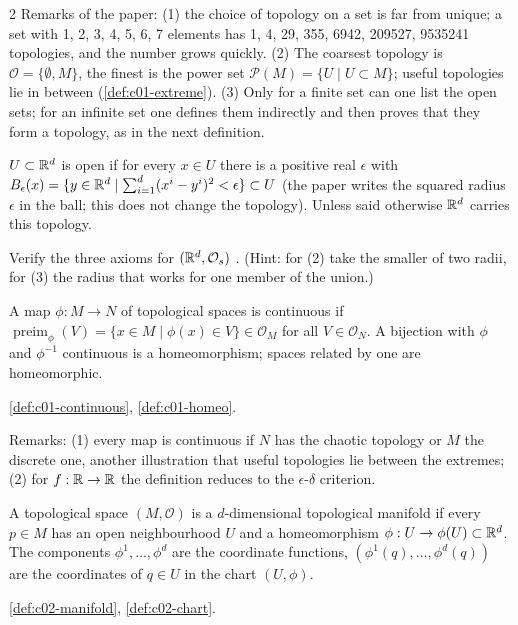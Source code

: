 \begin{paracol}{2}
Remarks of the paper: (1) the choice of topology on a set is far from unique; a set with 1, 2, 3, 4, 5, 6, 7 elements has 1, 4, 29, 355, 6942, 209527, 9535241 topologies, and the number grows quickly. (2) The coarsest topology is $\mathcal O=\{\emptyset,M\}$, the finest is the power set $\mathcal P(M)=\{U\mid U\subset M\}$; useful topologies lie in between (\cref{def:c01-extreme}). (3) Only for a finite set can one list the open sets; for an infinite set one defines them indirectly and then proves that they form a topology, as in the next definition.

\begin{definition}\label{def:c29-std}
$U\subset\mathbb{R}^d$ is open if for every $x\in U$ there is a positive real $\epsilon$ with $B_\epsilon(x)=\{y\in\mathbb{R}^d\mid\sum_{i=1}^d(x^i-y^i)^2<\epsilon\}\subset U$ (the paper writes the squared radius $\epsilon$ in the ball; this does not change the topology). Unless said otherwise $\mathbb{R}^d$ carries this topology.
\end{definition}

\begin{exercise}\label{ex:c29-rd}
Verify the three axioms for $(\mathbb{R}^d,\mathcal O_s)$ . (Hint: for (2) take the smaller of two radii, for (3) the radius that works for one member of the union.)
\end{exercise}

\begin{definition}\label{def:c29-cont}
A map $\phi:M\to N$ of topological spaces is continuous if $\operatorname{preim}_\phi(V)=\{x\in M\mid\phi(x)\in V\}\in\mathcal O_M$ for all $V\in\mathcal O_N$. A bijection with $\phi$ and $\phi^{-1}$ continuous is a homeomorphism; spaces related by one are homeomorphic.
\end{definition}
\begin{recall}[Continuity]
\cref{def:c01-continuous}, \cref{def:c01-homeo}.
\end{recall}

Remarks: (1) every map is continuous if $N$ has the chaotic topology or $M$ the discrete one, another illustration that useful topologies lie between the extremes; (2) for $f:\mathbb{R}\to\mathbb{R}$ the definition reduces to the $\epsilon$-$\delta$ criterion.

\begin{definition}\label{def:c29-manifold}
A topological space $(M,\mathcal O)$ is a $d$-dimensional topological manifold if every $p\in M$ has an open neighbourhood $U$ and a homeomorphism $\phi:U\to\phi(U)\subset\mathbb{R}^d$. The components $\phi^1,\dots,\phi^d$ are the coordinate functions, $(\phi^1(q),\dots,\phi^d(q))$ are the coordinates of $q\in U$ in the chart $(U,\phi)$.
\end{definition}
\begin{recall}[Manifolds]
\cref{def:c02-manifold}, \cref{def:c02-chart}.
\end{recall}


\end{paracol}
